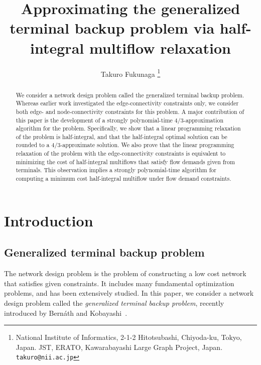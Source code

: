 \documentclass{article}
\title{Approximating the generalized terminal backup problem via
half-integral multiflow relaxation\footnotemark[2]}
\author{Takuro Fukunaga
\thanks{National Institute of Informatics,
2-1-2 Hitotsubashi, Chiyoda-ku, Tokyo, Japan.
JST, ERATO, Kawarabayashi Large Graph Project, Japan.
  {\tt takuro@nii.ac.jp}}}
\date{}
\begin{document}
\maketitle

\renewcommand{\thefootnote}{\fnsymbol{footnote}}


\begin{abstract}
We consider a network design problem called the generalized terminal backup problem.
Whereas earlier work investigated 
the edge-connectivity constraints only,
we consider both edge- and node-connectivity constraints for this problem.
A major contribution of this paper is 
the development of a strongly polynomial-time $4/3$-approximation algorithm 
for the problem. Specifically,
we show that a linear programming relaxation of the problem is half-integral,
and that the half-integral optimal solution can be rounded to a $4/3$-approximate solution.
We also prove that the linear programming relaxation of the problem with the edge-connectivity constraints 
is equivalent to minimizing the cost
of half-integral multiflows that satisfy flow demands given from terminals.
This observation implies a strongly polynomial-time algorithm 
for computing a minimum cost half-integral multiflow
under flow demand constraints.
\end{abstract}



\section{Introduction} 
\label{sec:introduction}

\subsection{Generalized terminal backup problem}
The network design problem is the problem of constructing a low cost network that satisfies
given constraints. It includes many fundamental optimization problems, and 
has been extensively studied. In this paper, we consider a network design problem
called the \emph{generalized terminal backup problem}, recently introduced by Bern{\'a}th and
Kobayashi~\cite{Bernath2014}. 
\end{document}
